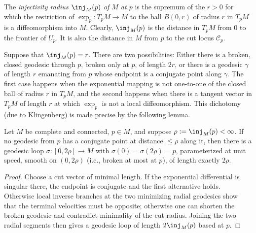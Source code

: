 \begin{definition}
\label{def:injectivity-radius}
\leanok

The {\sl injectivity radius $\inj_M(p)$ of $M$ at $p$} is the
supremum of the $r> 0$ for which the restriction of $\exp_p\colon T_pM\to M$ to the ball $B(0,r)$ of radius $r$ in $T_pM$
is a diffeomorphism into $M$. Clearly, $\inj_M(p)$ is the
distance in $T_pM$ from $0$ to the frontier of $U_p$. It is also the
distance in $M$ from $p$ to the cut locus ${\mathcal C}_p$.
\end{definition}

Suppose that  $\inj_M(p)=r$. There are two possibilities:
Either there is a broken, closed geodesic through $p$, broken only
at $p$, of length $2r$, or there is a geodesic $\gamma$ of length
$r$ emanating from $p$ whose endpoint is a conjugate point along
$\gamma$. The first case happens when the exponential mapping is not
one-to-one of the closed ball of radius $r$ in $T_pM$, and the
second happens when there is a tangent vector in $T_pM$ of length
$r$ at which $\exp_p$ is not a local diffeomorphism.
This dichotomy (due to Klingenberg) is made precise by the
following lemma.

\begin{lemma}
\label{lem:klingenberg-loop}

Let $M$ be complete and connected, $p\in M$, and suppose
$\rho:=\inj_M(p)<\infty$. If no geodesic from $p$ has a conjugate point at distance
$\le\rho$ along it, then there is a geodesic loop $\sigma\colon
[0,2\rho]\to M$ with $\sigma(0)=\sigma(2\rho)=p$, parameterized at
unit speed, smooth on $(0,2\rho)$ (i.e., broken at most at $p$), of
length exactly $2\rho$.
\end{lemma}

\begin{proof}
\sketch
{}
Choose a cut vector of minimal length. If the exponential differential is singular there, the endpoint is conjugate and the first alternative holds. Otherwise local inverse branches at the two minimizing radial geodesics show that the terminal velocities must be opposite; otherwise one can shorten the broken geodesic and contradict minimality of the cut radius. Joining the two radial segments then gives a geodesic loop of length $2\inj_M(p)$ based at $p$.
\end{proof}

